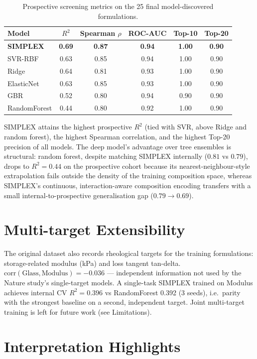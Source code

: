 \documentclass[utf8]{frontiers_suppmat}
\begin{document}
\begin{table}[h]
\centering
\caption{Prospective screening metrics on the 25 final model-discovered formulations.}
\label{tab:ext}
\begin{tabular}{lccccc}
\toprule
Model & $R^2$ & Spearman $\rho$ & ROC-AUC & Top-10 & Top-20 \\
\midrule
\textbf{SIMPLEX} & \textbf{0.69} & \textbf{0.87} & \textbf{0.94} & \textbf{1.00} & \textbf{0.90} \\
SVR-RBF & 0.63 & 0.85 & 0.94 & 1.00 & 0.90 \\
Ridge & 0.64 & 0.81 & 0.93 & 1.00 & 0.90 \\
ElasticNet & 0.63 & 0.85 & 0.93 & 1.00 & 0.90 \\
GBR & 0.52 & 0.80 & 0.94 & 0.90 & 0.90 \\
RandomForest & 0.44 & 0.80 & 0.92 & 1.00 & 0.90 \\
\bottomrule
\end{tabular}
\end{table}

SIMPLEX attains the highest prospective $R^2$ (tied with SVR, above Ridge and
random forest), the highest Spearman correlation, and the highest Top-20
precision of all models. The deep model's advantage over tree ensembles is
structural: random forest, despite matching SIMPLEX internally ($0.81$ vs
$0.79$), drops to $R^2 = 0.44$ on the prospective cohort because its
nearest-neighbour-style extrapolation fails outside the density of the
training composition space, whereas SIMPLEX's continuous, interaction-aware
composition encoding transfers with a small internal-to-prospective
generalisation gap ($0.79 \rightarrow 0.69$).

\section{Multi-target Extensibility}

The original dataset also records rheological targets for the training
formulations: storage-related modulus (kPa) and loss tangent tan-delta.
$\mathrm{corr}(\mathrm{Glass}, \mathrm{Modulus}) = -0.036$ --- independent
information not used by the Nature study's single-target models. A
single-task SIMPLEX trained on Modulus achieves internal CV $R^2 = 0.396$ vs
RandomForest 0.392 (3 seeds), i.e.\ parity with the strongest baseline on a
second, independent target. Joint multi-target training is left for future
work (see Limitations).

\section{Interpretation Highlights}
\end{document}
